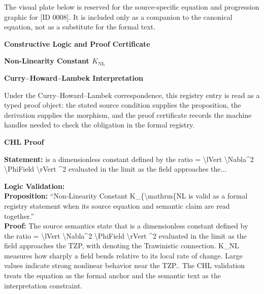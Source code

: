 \begingroup\footnotesize\sloppy
The visual plate below is reserved for the source-specific equation and progression graphic for [ID 0008]. It is included only as a companion to the canonical equation, not as a substitute for the formal text.
\par\endgroup
\ifTZPDarkEdition
{}
\fi

\clearpage
\begingroup\tzpsupportsetup
\noindent\textbf{\fontsize{10.8pt}{12.8pt}\selectfont [ID 0008] Constructive Logic and Proof Certificate}\par
\noindent\textbf{\fontsize{10pt}{12pt}\selectfont Non-Linearity Constant $K_{\mathrm{NL}}$}\par
\vspace{0.45em}
\begingroup
\footnotesize
\setlength{\parskip}{0.22em}
\setlength{\parindent}{0pt}
\noindent\textbf{Curry--Howard--Lambek Interpretation}\par
Under the Curry--Howard--Lambek correspondence, this registry entry is read as a typed proof
object: the stated source condition supplies the proposition, the derivation supplies the
morphism, and the proof certificate records the machine handles needed to check the obligation
in the formal registry.

\vspace{0.45em}
\noindent\textbf{CHL Proof}\par
\textbf{Statement:}  is a dimensionless constant defined by the ratio  = \textbackslash{}lVert \textbackslash{}Nabla\textasciicircum{}2 \textbackslash{}PhiField \textbackslash{}rVert
\textasciicircum{}2 evaluated in the limit as the field  approaches the...

\textbf{Logic Validation:}\\
\textbf{Proposition:} ``Non‑Linearity Constant K\_\{\textbackslash{}mathrm\{NL is valid as a formal registry statement when its
source equation and semantic claim are read together.''\\
\textbf{Proof:} The source semantics state that  is a dimensionless constant defined by the ratio  =
\textbackslash{}lVert \textbackslash{}Nabla\textasciicircum{}2 \textbackslash{}PhiField \textbackslash{}rVert \textasciicircum{}2 evaluated in the limit as the field  approaches
the TZP, with  denoting the Trawinistic connection. K\_NL measures how sharply a
field bends relative to its local rate of change. Large values indicate strong nonlinear
behavior near the TZP.. The CHL validation treats the equation as the formal anchor and
the semantic text as the interpretation constraint.

